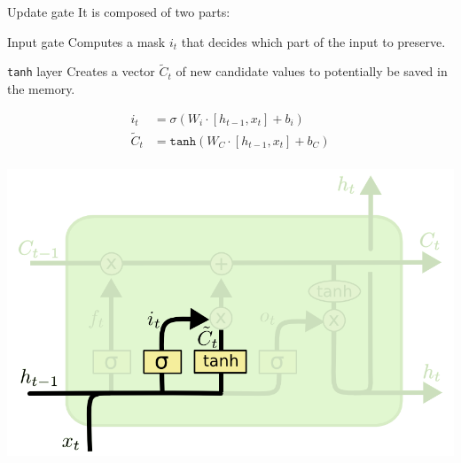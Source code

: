 \begin{descriptionlist}
    \item[Update gate] 
        It is composed of two parts:
        \begin{descriptionlist}
            \item[Input gate] Computes a mask $i_t$ that decides which part of the input to preserve.
            \item[\texttt{tanh} layer] Creates a vector $\tilde{C}_t$ of new candidate values to potentially be saved in the memory.
        \end{descriptionlist}
        \begin{minipage}{0.6\linewidth}
            \[
                \begin{split}
                    i_t &= \sigma( W_i \cdot [h_{t-1}, x_t] + b_i) \\
                    \tilde{C}_t &= \texttt{tanh}( W_C \cdot [h_{t-1}, x_t] + b_C) \\
                \end{split}
            \]
        \end{minipage}
        \begin{minipage}{0.35\linewidth}
            \centering
            \includegraphics[width=0.85\linewidth]{./img/update_gate.png}
        \end{minipage}


\end{descriptionlist}
